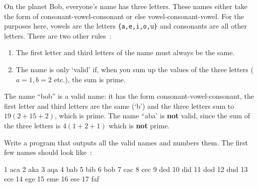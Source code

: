 
On the planet Bob, everyone's name has three letters.
These names either take the form of consonant-vowel-consonant or
else vowel-consonant-vowel. For the purposes here, vowels are the 
letters \verb^{a,e,i,o,u}^ and consonants are all other letters.
There are two other rules~:
\begin{enumerate}
\item The first letter and third letters of the name must always be the same.
\item The name is only `valid' if,
when you sum up the values of the three letters ($a=1, b=2$ etc.),
the sum is prime.
\end{enumerate}

The name ``bob'' is a valid name: it has the form consonant-vowel-consonant,
the first letter and third letters are the same (`b') and  the three letters sum to $19 (2+15+2)$, which is prime.
The name ``aba' is \textbf{not} valid, since the sum of the three
letters is $4 (1+2+1)$ which is \textbf{not} prime.


\begin{exercise}
Write a program that outputs all the valid names and
numbers them. The first few names should look like~:
\begin{terminaloutput}
  1 aca
  2 aka
  3 aqa
  4 bab
  5 bib
  6 bob
  7 cac
  8 cec
  9 ded
 10 did
 11 dod
 12 dud
 13 ece
 14 ege
 15 eme
 16 ese
 17 faf
\end{terminaloutput}
\end{exercise}

